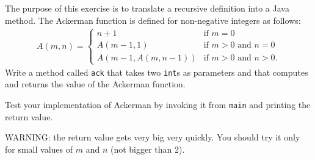 \begin{exercise}
The purpose of this exercise is to translate a recursive definition
into a Java method.  The Ackerman function is defined for non-negative
integers as follows:
%
\begin{eqnarray}
A(m, n) = \begin{cases}
              n+1 & \mbox{if } m = 0 \\
        A(m-1, 1) & \mbox{if } m > 0 \mbox{ and } n = 0 \\
A(m-1, A(m, n-1)) & \mbox{if } m > 0 \mbox{ and } n > 0.
\end{cases}
\end{eqnarray}
%
Write a method called {\tt ack} that takes two {\tt int}s as
parameters and that computes and returns the value
of the Ackerman function.

Test your implementation of Ackerman by invoking it
from {\tt main} and printing the return value.

WARNING: the return value gets very big very quickly.  You should try it
only for small values of $m$ and $n$ (not bigger than 2).

\end{exercise}


